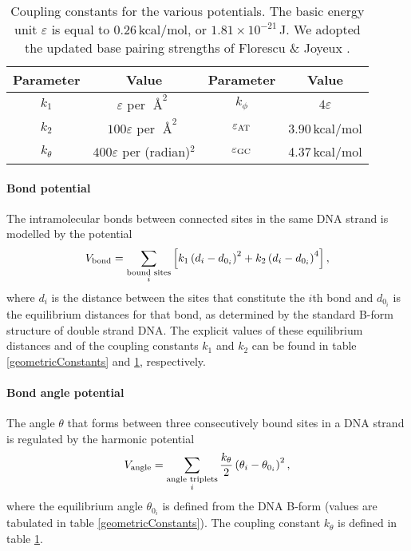 \begin{table}[hbt]
\begin{center}
\caption{Coupling constants for the various potentials. The basic energy unit $\varepsilon$ is equal to $0.26$\,kcal/mol, or $1.81 \times 10^{-21}$\,J.
We adopted the updated base pairing strengths of Florescu \& Joyeux \cite{florescu2011thermal}.}
\begin{tabular}{cc||cc}
Parameter & Value & Parameter & Value\\\hline
$k_1$ & $\varepsilon$ per $\Angstrom^2$ &
	$k_\phi$ & $4\varepsilon$ \\
$k_2$ & $100\varepsilon$ per $\Angstrom^2$ &
	$\varepsilon_\text{AT}$ & 3.90\,kcal/mol\\
$k_\theta$ & $400\varepsilon$ per (radian)$^2$ &
	$\varepsilon_\text{GC}$ & 4.37\,kcal/mol\\
\end{tabular}\label{couplingConstants}
\end{center}
\end{table}



\paragraph{Bond potential}
The intramolecular bonds between connected sites in the same DNA strand is modelled by the potential
\begin{equation}
V_\text{bond}
= \sum_{\substack{\text{bound sites}\\i}} \left[
	k_1 \left(d_i - d_{0_i}\right)^2
	+ k_2 \left(d_i - d_{0_i}\right)^4
\right],
\end{equation}
where $d_i$ is the distance between the sites that constitute the $i$th bond and $d_{0_i}$ is the equilibrium distances for that bond, as determined by the standard B-form structure of double strand DNA. The explicit values of these equilibrium distances and of the coupling constants $k_1$ and $k_2$ can be found in table \ref{geometricConstants} and \ref{couplingConstants}, respectively.


\paragraph{Bond angle potential}
The angle $\theta$ that forms between three consecutively bound sites in a DNA strand is regulated by the harmonic potential
\begin{equation}
V_\text{angle}
= \sum_{\substack{\text{angle triplets}\\i}}
	\frac{k_\theta}{2} \left(
		\theta_i - \theta_{0_i}
	\right)^2,
\end{equation}
where the equilibrium angle $\theta_{0_i}$ is defined from the DNA B-form (values are tabulated in table \ref{geometricConstants}). The coupling constant $k_\theta$ is defined in table \ref{couplingConstants}.


